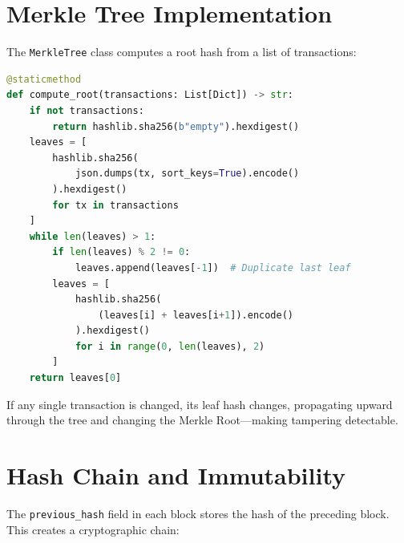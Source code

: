 \documentclass[12pt, a4paper]{report}
\begin{document}
\section{Merkle Tree Implementation}

The \texttt{MerkleTree} class computes a root hash from a list of transactions:

\begin{lstlisting}[language=Python, caption={Merkle Tree root computation.}]
@staticmethod
def compute_root(transactions: List[Dict]) -> str:
    if not transactions:
        return hashlib.sha256(b"empty").hexdigest()
    leaves = [
        hashlib.sha256(
            json.dumps(tx, sort_keys=True).encode()
        ).hexdigest()
        for tx in transactions
    ]
    while len(leaves) > 1:
        if len(leaves) % 2 != 0:
            leaves.append(leaves[-1])  # Duplicate last leaf
        leaves = [
            hashlib.sha256(
                (leaves[i] + leaves[i+1]).encode()
            ).hexdigest()
            for i in range(0, len(leaves), 2)
        ]
    return leaves[0]
\end{lstlisting}

If any single transaction is changed, its leaf hash changes, propagating
upward through the tree and changing the Merkle Root—making tampering
detectable.

\section{Hash Chain and Immutability}

The \texttt{previous\_hash} field in each block stores the hash of the
preceding block. This creates a cryptographic chain:

\begin{center}
\end{center}
\end{document}

